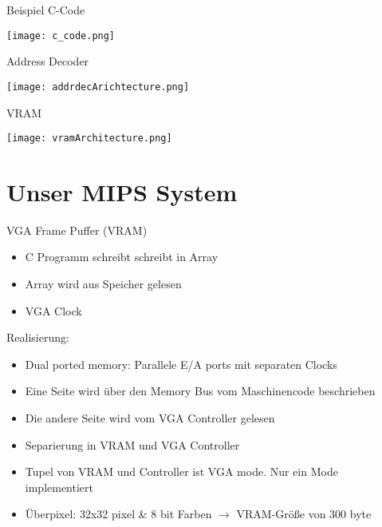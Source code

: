 \begin{frame}{Beispiel C-Code}
\begin{center}
\texttt{[image: c\_code.png]}
\end{center} 
\end{frame}

\begin{frame}{Address Decoder}
\begin{center}
\texttt{[image: addrdecArichtecture.png]}
\end{center} 
\end{frame}

\begin{frame}{VRAM}
\begin{center}
\texttt{[image: vramArchitecture.png]}
\end{center} 
\end{frame}

\section{Unser MIPS System}

\begin{frame}{VGA Frame Puffer (VRAM)}
	\begin{itemize}
		\item C Programm schreibt schreibt in Array
		\item Array wird aus Speicher gelesen
		\item VGA Clock
	\end{itemize}
	\pause
	Realisierung:
	\begin{itemize}
		\item Dual ported memory: Parallele E/A ports mit separaten Clocks
		\item Eine Seite wird über den Memory Bus vom Maschinencode beschrieben
		\item Die andere Seite wird vom VGA Controller gelesen
		\item Separierung in VRAM und VGA Controller
		\item Tupel von VRAM und Controller ist VGA mode. Nur ein Mode implementiert
		\item Überpixel: 32x32 pixel \& 8 bit Farben $\rightarrow$ VRAM-Größe von 300 byte
	\end{itemize}

\end{frame}

